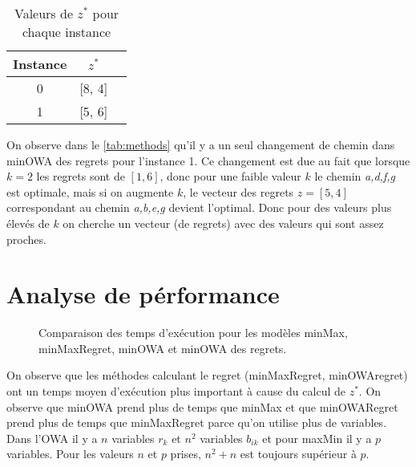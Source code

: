 \documentclass[10pt,a4paper]{report}
\begin{document}
\begin{table}[h!]
\centering
\begin{tabular}{|c|c|c|}
\hline
Instance & \( z^* \) \\
\hline
0 & [8, 4] \\
1 & [5, 6] \\
\hline
\end{tabular}
\caption{Valeurs de \( z^* \) pour chaque instance}
\label{tab:z_star}
\end{table}
On observe dans le \autoref{tab:methods} qu'il y a un seul changement de chemin dans minOWA des regrets pour l'instance 1. Ce changement est due au fait que lorsque $k=2$ les regrets sont de $[1,6]$, donc pour une faible valeur $k$ le chemin \textit{a,d,f,g} est optimale, mais si on augmente $k$, le vecteur des regrets $z=[5,4]$ correspondant au chemin \textit{a,b,e,g} devient l'optimal. Donc pour des valeurs plus élevés de $k$ on cherche un vecteur (de regrets) avec des valeurs qui sont assez proches.

\section{Analyse de pérformance}
\begin{figure}[h!]
    \centering
      
    \caption{Comparaison des temps d'exécution pour les modèles minMax, minMaxRegret, minOWA et minOWA des regrets.}
    \label{fig:performance_ex3}
\end{figure}
On observe que les méthodes calculant le regret (minMaxRegret, minOWAregret) ont un temps moyen d'exécution plus important à cause du calcul de $z^*$. On observe que minOWA prend plus de temps que minMax et que minOWARegret prend plus de temps que minMaxRegret parce qu'on utilise plus de variables. Dans l'OWA il y a $n$ variables $r_k$ et $n^2$ variables $b_{ik}$ et pour maxMin il y a $p$ variables. Pour les valeurs $n$ et $p$ prises, $n^2+n$ est toujours supérieur à $p$.
\end{document}
